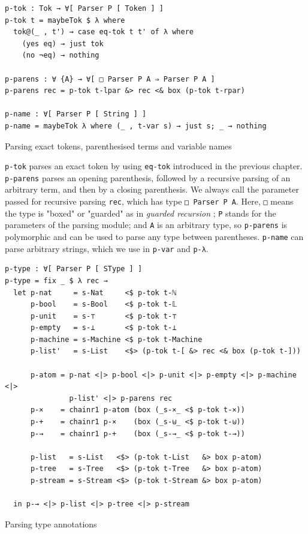\begin{listing}[H]
\begin{verbatim}
p-tok : Tok → ∀[ Parser P [ Token ] ]
p-tok t = maybeTok $ λ where
  tok@(_ , t') → case eq-tok t t' of λ where
    (yes eq) → just tok
    (no ¬eq) → nothing

p-parens : ∀ {A} → ∀[ □ Parser P A ⇒ Parser P A ]
p-parens rec = p-tok t-lpar &> rec <& box (p-tok t-rpar)

p-name : ∀[ Parser P [ String ] ]
p-name = maybeTok λ where (_ , t-var s) → just s; _ → nothing
\end{verbatim}
\caption{Parsing exact tokens, parenthesised terms and variable names}
\label{code:parse-basic-parsers}
\end{listing}

\verb$p-tok$ parses an exact token by using \verb$eq-tok$ introduced in the previous chapter. \verb$p-parens$ parses an opening parenthesis, followed by a recursive parsing of an arbitrary term, and then by a closing parenthesis. We always call the parameter passed for recursive parsing \verb$rec$, which has type \verb$□ Parser P A$. Here, \verb$□$ means the type is "boxed" or "guarded" as in \textit{guarded recursion} \cite{veltri2019guarded}; \verb$P$ stands for the parameters of the parsing module; and \verb$A$ is an arbitrary type, so \verb$p-parens$ is polymorphic and can be used to parse any type between parentheses. \verb$p-name$ can parse arbitrary strings, which we use in \verb$p-var$ and \verb$p-λ$.

\begin{listing}[H]
\begin{verbatim}
p-type : ∀[ Parser P [ SType ] ]
p-type = fix _ $ λ rec →
  let p-nat     = s-Nat     <$ p-tok t-ℕ
      p-bool    = s-Bool    <$ p-tok t-𝕃
      p-unit    = s-⊤       <$ p-tok t-⊤
      p-empty   = s-⊥       <$ p-tok t-⊥
      p-machine = s-Machine <$ p-tok t-Machine
      p-list'   = s-List    <$> (p-tok t-[ &> rec <& box (p-tok t-]))

      p-atom = p-nat <|> p-bool <|> p-unit <|> p-empty <|> p-machine <|>
               p-list' <|> p-parens rec
      p-×    = chainr1 p-atom (box (_s-×_ <$ p-tok t-×))
      p-+    = chainr1 p-×    (box (_s-⊎_ <$ p-tok t-⊎))
      p-→    = chainr1 p-+    (box (_s-→_ <$ p-tok t-→))

      p-list   = s-List   <$> (p-tok t-List   &> box p-atom)
      p-tree   = s-Tree   <$> (p-tok t-Tree   &> box p-atom)
      p-stream = s-Stream <$> (p-tok t-Stream &> box p-atom)

  in p-→ <|> p-list <|> p-tree <|> p-stream
\end{verbatim}
\caption{Parsing type annotations}
\label{code:parse-p-type}
\end{listing}

